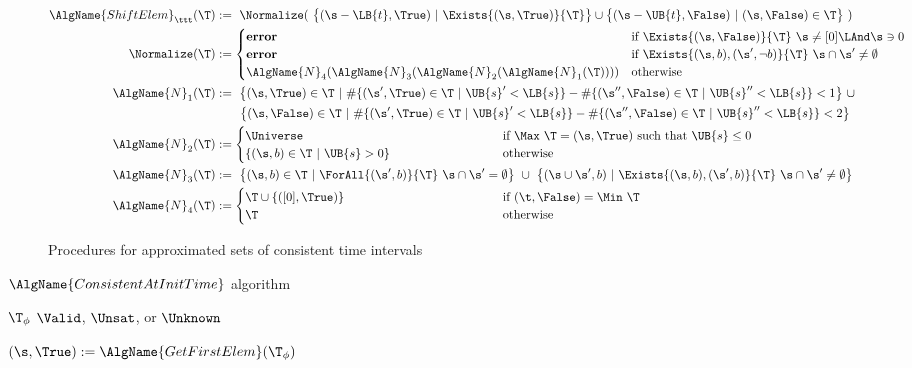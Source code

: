 \documentclass[paper]{ieice}
\begin{document}
\begin{figure*}[t]
\begin{align*}
\AlgName{ShiftElem}_\ttt(\T) &:=~
		\Normalize(\ \bigl\{ (\s-\LB{t},\True) ~|~ \Exists{(\s,\True)}{\T} \bigr\} \cup 
		\bigl\{(\s-\UB{t},\False) ~|~ {(\s,\False)}\in{\T} \bigr\}\ ) \\
\Normalize(\T) &:=
	\begin{cases}
		\textbf{error} & \text{if $\Exists{(\s,\False)}{\T} ~ \s \neq [0] \LAnd \s \ni 0$} \\
		\makebox[20em][l]{$\textbf{error}$} & \text{if $\Exists{(\s,b),(\s',\neg b)}{\T} ~ \s \cap \s' \neq \emptyset$} \\
\AlgName{N}_4(\AlgName{N}_3(\AlgName{N}_2(\AlgName{N}_1(\T)))) & \text{otherwise}
	\end{cases} \\
\AlgName{N}_1(\T) &:=~ \bigl\{ (\s,\True)\in\T ~|~ 
		\# \{(\s',\True)\in\T ~|~ \UB{s}' < \LB{s}\} - 
		\# \{(\s'',\False)\in\T ~|~ \UB{s}'' < \LB{s}\} < 1 \bigr\}\ \cup \\
	& \qquad \bigl\{ (\s,\False)\in\T ~|~ 
		\# \{(\s',\True)\in\T ~|~ \UB{s}' < \LB{s}\} - 
		\# \{(\s'',\False)\in\T ~|~ \UB{s}'' < \LB{s}\} < 2 \bigr\} \\
\AlgName{N}_2(\T) &:=
	\begin{cases}
		\makebox[20em][l]{$\Universe$} & \text{if $\Max\ \T = (\s,\True)$ such that $\UB{s} \leq 0$}\\
		\{ (\s,b)\in\T ~|~ \UB{s} > 0 \} & \text{otherwise}
	\end{cases} \\
	\AlgName{N}_3(\T) &:=~ \bigl\{ (\s,b)\in\T ~|~ \ForAll{(\s',b)}{\T} ~ \s\cap\s' = \emptyset \bigr\} ~\cup~ \bigl\{ (\s\cup\s',b) ~|~ \Exists{(\s,b),(\s',b)}{\T}~ \s\cap\s' \neq \emptyset \bigr\} \\
\AlgName{N}_4(\T) &:=
	\begin{cases}
		\makebox[20em][l]{$\T \cup \{([0],\True)\}$} & \text{if $(\t,\False) = \Min\ \T$} \\
		\T & \text{otherwise}
	\end{cases} \\
\end{align*}
\caption{\label{f:operations} Procedures for approximated sets of consistent time intervals}
\end{figure*}

\begin{algorithm}[thb]
\caption{\label{a:inittime} $\AlgName{ConsistentAtInitTime}$ algorithm}

\begin{algorithmic}[1]
  \REQUIRE $\T_\phi$
  \ENSURE $\Valid$, $\Unsat$, or $\Unknown$

  \IF{$\T_\phi = \Universe$}
	\RETURN{$\Valid$}
  \ELSIF{$\T_\phi = \emptyset$}
	\RETURN{$\Unsat$}
\ELSE
    \STATE $(\s,\True) := \AlgName{GetFirstElem}(\T_\phi)$
	  \RETURN{$\Valid$}
	  \RETURN{$\Unsat$}
    \ELSEC{$0 \in \s$}
	  \RETURN{$\Unknown$}
    \ENDIF
  \ENDIF
\end{algorithmic}
\end{algorithm}
\end{document}
